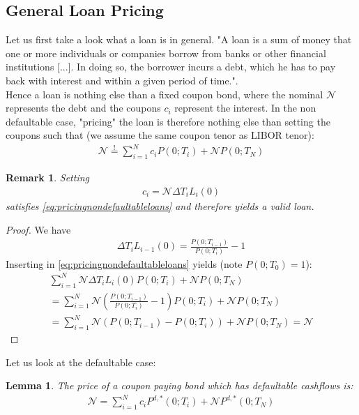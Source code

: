 \documentclass[12pt]{article}
\newcommand{\mbeq}{\overset{!}{=}}
\newtheorem{lemma}[theorem]{Lemma}
\newtheorem{remark}[theorem]{Remark}
\begin{document}
	\subsection{General Loan Pricing}
	Let us first take a look what a loan is in general. "A loan is a sum of money that one or more individuals or companies borrow from banks or other financial institutions [...]. In doing so, the borrower incurs a debt, which he has to pay back with interest and within a given period of time."\cite{corpFinInst}.\\
	Hence a loan is nothing else than a fixed coupon bond, where the nominal $\mathcal{N}$ represents the debt and the coupons $c_i$ represent the interest.
	In the non defaultable case, "pricing" the loan is therefore nothing else than setting the coupons such that (we assume the same coupon tenor as LIBOR tenor):
	\begin{align}\label{eq:pricingnondefaultableloans}
		\mathcal{N} \mbeq \sum_{i=1}^{N}c_i P(0;T_i) + \mathcal{N}P(0;T_N)
	\end{align}
	\begin{remark}\label{rem:nativecouponsforloans}
		Setting 
		\begin{align*}
			c_i = \mathcal{N}\Delta T_iL_i(0)
		\end{align*}
		satisfies \cref{eq:pricingnondefaultableloans} and therefore yields a valid loan.
	\end{remark}
	\begin{proof}
		We have 
		\begin{align*}
			\Delta T_iL_{i-1}(0) = \frac{P(0;T_{i-1})}{P(0;T_{i})} - 1
		\end{align*}
		Inserting in \cref{eq:pricingnondefaultableloans} yields (note $P(0;T_0) = 1$):
		\begin{align*}
			\sum_{i=1}^{N}\mathcal{N}\Delta T_iL_i(0) P(0;T_i) + \mathcal{N}P(0;T_N) \\
			=\sum_{i=1}^{N}\mathcal{N}(\frac{P(0;T_{i-1})}{P(0;T_{i})} - 1) P(0;T_i) + \mathcal{N}P(0;T_N)\\
			= \sum_{i=1}^{N}\mathcal{N}(P(0;T_{i-1}) - P(0;T_{i})) + \mathcal{N}P(0;T_N) = \mathcal{N}
		\end{align*}
	\end{proof}
	Let us look at the defaultable case:
	\begin{lemma}
		The price of a coupon paying bond which has defaultable cashflows is:
		\begin{align*}
			\mathcal{N} = \sum_{i=1}^{N}c_i P^{d,*}(0;T_i) + \mathcal{N}P^{d,*}(0;T_N)
		\end{align*}
	\end{lemma}
\end{document}
